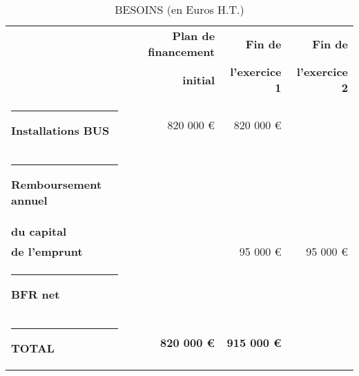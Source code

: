 \documentclass[12pt,a4paper]{report}
\begin{document}
	\begin{table}[h]
		\centering
		\caption{\color{green}BESOINS (en Euros H.T.)}
		\vspace{0.5cm}
		\begin{tabular}{l|r|r|r}
					
			&\textbf{Plan de financement}&\textbf{Fin de } & \textbf{Fin de }\\
			& \textbf{initial} &\textbf{l'exercice 1} & \textbf{l'exercice 2} \\
			\hline
			\rule[0.5cm]{-0.1cm}{0cm}				
			\textbf{Installations BUS} & 820 000 € & 820 000 € & \\		
			\rule[0.5cm]{-0.1cm}{0cm}				
			\textbf{Remboursement annuel}&  &  & \\							
			\textbf{du capital}			&  &  & \\				
			\textbf{de l'emprunt}	&  & 95 000 € & 95 000 €\\	
			\rule[0.5cm]{-0.1cm}{0cm}				
			\textbf{BFR net}&  &  & \\		
			\rule[0.5cm]{-0.1cm}{0cm}		
			\textbf{\color{green}TOTAL}		& 	\textbf{\color{green}820 000 €}	&\textbf{\color{green} 915 000 €}	  & \\
			\end{tabular}%
		\label{tab:addlabel}%
		\end{table}%
	
\end{document}
